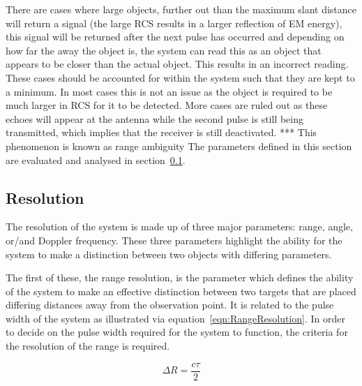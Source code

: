 \documentclass[11pt]{witseiepaper}
\begin{document}
There are cases where large objects, further out than the maximum slant distance will return a signal (the large RCS results in a larger reflection of EM energy), this signal will be returned after the next pulse has occurred and depending on how far the away the object is, the system can read this as an object that appears to be closer than the actual object. This results in an incorrect reading. These cases should be accounted for within the system such that they are kept to a minimum. In most cases this is not an issue as the object is required to be much larger in RCS for it to be detected. More cases are ruled out as these echoes will appear at the antenna while the second pulse is still being transmitted, which implies that the receiver is still deactivated. ***
This phenomenon is known as range ambiguity \cite[p.~22]{radarHandbook}
The parameters defined in this section are evaluated and analysed in section~\ref{sec:Resolution}.

\subsection{Resolution} \label{sec:Resolution}
The resolution of the system is made up of three major parameters: range, angle, or/and Doppler frequency. These three parameters highlight the ability for the system to make a distinction between two objects with differing parameters.

The first of these, the range resolution, is the parameter which defines the ability of the system to make an  effective distinction between two targets that are placed differing distances away from the observation point. It is related to the pulse width of the system as illustrated via equation~\ref{eqn:RangeResolution}. In order to decide on the pulse width required for the system to function, the criteria for the resolution of the range is required.

\begin{equation} \label{eqn:RangeResolution}
\Delta R = \frac{c \tau}{2}
\end{equation}
\end{document}
